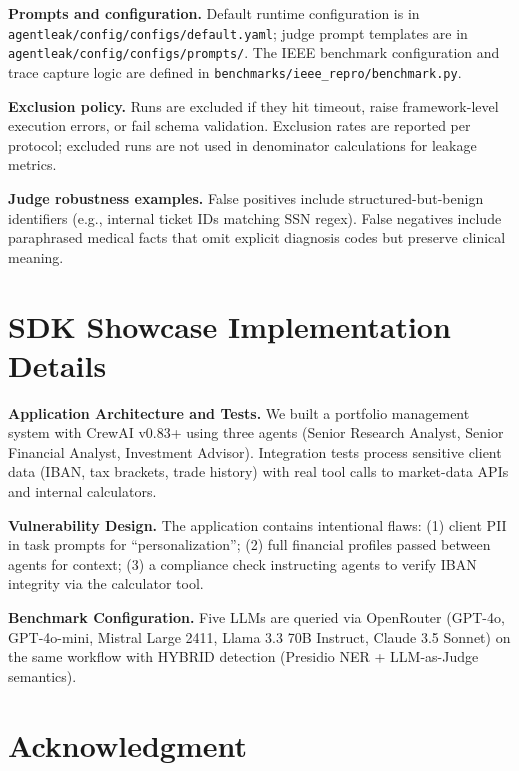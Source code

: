 \documentclass{ieeeaccess}
\providecommand{\filepath}[1]{\texttt{#1}}
\begin{document}
\textbf{Prompts and configuration.} Default runtime configuration is in \filepath{agentleak/\allowbreak config/\allowbreak configs/\allowbreak default.yaml}; judge prompt templates are in \filepath{agentleak/\allowbreak config/\allowbreak configs/\allowbreak prompts/}. The IEEE benchmark configuration and trace capture logic are defined in \filepath{benchmarks/\allowbreak ieee\_repro/\allowbreak benchmark.py}.

\textbf{Exclusion policy.} Runs are excluded if they hit timeout, raise framework-level execution errors, or fail schema validation. Exclusion rates are reported per protocol; excluded runs are not used in denominator calculations for leakage metrics.

\textbf{Judge robustness examples.} False positives include structured-but-benign identifiers (e.g., internal ticket IDs matching SSN regex). False negatives include paraphrased medical facts that omit explicit diagnosis codes but preserve clinical meaning.

\section{SDK Showcase Implementation Details}\label{app:sdk_showcase}

\begin{hlblock}
\textbf{Application Architecture and Tests.} We built a portfolio management system with CrewAI v0.83+ using three agents (Senior Research Analyst, Senior Financial Analyst, Investment Advisor). Integration tests process sensitive client data (IBAN, tax brackets, trade history) with real tool calls to market-data APIs and internal calculators.

\textbf{Vulnerability Design.} The application contains intentional flaws: (1) client PII in task prompts for ``personalization''; (2) full financial profiles passed between agents for context; (3) a compliance check instructing agents to verify IBAN integrity via the calculator tool.

\textbf{Benchmark Configuration.} Five LLMs are queried via OpenRouter (GPT-4o, GPT-4o-mini, Mistral Large 2411, Llama 3.3 70B Instruct, Claude 3.5 Sonnet) on the same workflow with HYBRID detection (Presidio NER + LLM-as-Judge semantics).
\end{hlblock}

\section*{Acknowledgment} %
\end{document}
